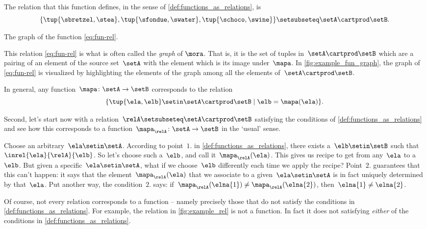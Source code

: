 The relation that this function defines, in the sense of \cref{def:functions_as_relations}, is
%
\begin{equation*}
    \label{eq:fun-rel}
    \{ \tup{\sbretzel, \stea}, \tup{\sfondue, \swater}, \tup{\schoco, \swine} \} \setsubseteq \setA \cartprod \setB.
\end{equation*}

\begin{marginfigure}
    \centering
    \caption{The graph of the function \cref{eq:fun-rel}.}
    \label{fig:example_fun_graph}
\end{marginfigure}

This relation \cref{eq:fun-rel} is what is often called the \emph{graph} of $\mora$.
That is, it is the set of tuples in~$\setA \cartprod \setB$ which are a pairing of an element of the source set~$\setA$ with the element which is its image under~$\mapa$.
In \cref{fig:example_fun_graph}, the graph of \cref{eq:fun-rel} is visualized by highlighting the elements of the graph among all the elements of~$\setA \cartprod \setB$.

In general, any function~$\mapa \colon \setA \to \setB$ corresponds to the relation
\begin{equation*}
    \{ \tup{\ela,\elb} \setin \setA \cartprod \setB \mid \elb= \mapa(\ela) \}.
\end{equation*}

Second, let's start now with a relation~$\relA \setsubseteq \setA \cartprod \setB$ satisfying the conditions of \cref{def:functions_as_relations} and see how this corresponds to a function~$\mapa_\relA \colon \setA \to \setB$ in the `usual' sense.

Choose an arbitrary~$\ela \setin \setA$.
According to point~$1.
$ in \cref{def:functions_as_relations}, there exists a~$\elb \setin \setB$ such that~$\inrel{\ela}{\relA}{\elb}$.
So let's choose such a~$\elb$, and call it~$\mapa_\relA(\ela)$.
This gives us recipe to get from any~$\ela$ to a~$\elb$.
But given a specific~$\ela \setin \setA$, what if we choose~$\elb$ differently each time we apply the recipe?
Point~$2.
$ guarantees that this can't happen: it says that the element~$\mapa_\relA(\ela)$ that we associate to a given~$\ela \setin \setA$ is in fact uniquely determined by that~$\ela$.
Put another way, the condition~$2.
$ says: if~$\mapa_\relA(\elna{1}) \neq \mapa_\relA(\elna{2})$, then~$\elna{1} \neq\elna{2}$.

\begin{remark}
    Of course, not every relation corresponds to a function -- namely precisely those that do not satisfy the conditions in \cref{def:functions_as_relations}.
    For example, the relation in \cref{fig:example_rel} is not a function.
    In fact it does not satisfying \emph{either} of the conditions in \cref{def:functions_as_relations}.
\end{remark}


